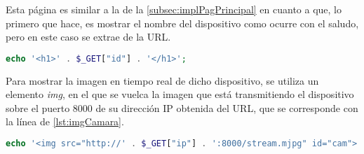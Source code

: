 Esta página es similar a la de la \autoref{subsec:implPagPrincipal} en cuanto a que, lo primero que hace, es mostrar el nombre del dispositivo como ocurre con el saludo, pero en este caso se extrae de la URL\@.
\begin{lstlisting}[language=PHP, caption=Nombre del dispositivo en la cabecera de la página, label=lst:nombreDispositivo]
echo '<h1>' . $_GET["id"] . '</h1>';
\end{lstlisting}

Para mostrar la imagen en tiempo real de dicho dispositivo, se utiliza un elemento \textit{img}, en el que se vuelca la imagen que está transmitiendo el dispositivo sobre el puerto 8000 de su dirección IP obtenida del URL, que se corresponde con la línea de \autoref{lst:imgCamara}.
\begin{lstlisting}[language=PHP, caption=Cuadro de imagen de la cámara, label=lst:imgCamara]
echo '<img src="http://' . $_GET["ip"] . ':8000/stream.mjpg" id="cam">'
\end{lstlisting}

